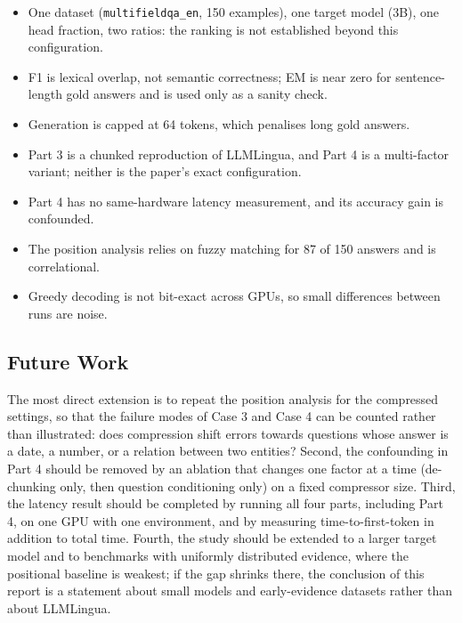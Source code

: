 \documentclass[10pt,a4paper,twocolumn]{article}
\begin{document}
\begin{itemize}
    \item One dataset (\texttt{multifieldqa\_en}, 150 examples), one target model
    (3B), one head fraction, two ratios: the ranking is not established beyond
    this configuration.
    \item F1 is lexical overlap, not semantic correctness; EM is near zero for
    sentence-length gold answers and is used only as a sanity check.
    \item Generation is capped at 64 tokens, which penalises long gold answers.
    \item Part 3 is a chunked reproduction of LLMLingua, and Part 4 is a
    multi-factor variant; neither is the paper's exact configuration.
    \item Part 4 has no same-hardware latency measurement, and its accuracy gain is
    confounded.
    \item The position analysis relies on fuzzy matching for 87 of 150 answers and
    is correlational.
    \item Greedy decoding is not bit-exact across GPUs, so small differences
    between runs are noise.
\end{itemize}

\subsection{Future Work}

The most direct extension is to repeat the position analysis for the compressed
settings, so that the failure modes of Case 3 and Case 4 can be counted rather
than illustrated: does compression shift errors towards questions whose answer is
a date, a number, or a relation between two entities? Second, the confounding in
Part 4 should be removed by an ablation that changes one factor at a time
(de-chunking only, then question conditioning only) on a fixed compressor size.
Third, the latency result should be completed by running all four parts, including
Part 4, on one GPU with one environment, and by measuring time-to-first-token in
addition to total time. Fourth, the study should be extended to a larger target
model and to benchmarks with uniformly distributed evidence, where the positional
baseline is weakest; if the gap shrinks there, the conclusion of this report is a
statement about small models and early-evidence datasets rather than about
LLMLingua.

\end{document}
